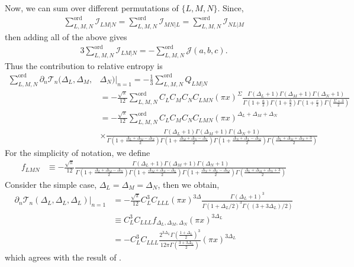 \documentclass[11pt]{article}
\newcommand{\p}{\partial}
\newcommand{\nn}{\nonumber}
\newcommand{\lb}{\left(}
\newcommand{\rb}{\right)}
\begin{document}
Now, we can sum over different permutations of $\{L,M,N\}$. Since,
\begin{align}
    \sum_{L,M,N}^{\text{ord}}\mathcal{I}_{LM|N} =\sum_{L,M,N}^{\text{ord}}\mathcal{I}_{MN|L} =\sum_{L,M,N}^{\text{ord}}\mathcal{I}_{NL|M}  
\end{align}
then adding all of the above gives
\begin{align}
    3\sum_{L,M,N}^{\text{ord}}\mathcal{I}_{LM|N} = - \sum_{L,M,N}^{\text{ord}}\mathcal{J}(a,b,c).
\end{align}
Thus the contribution to relative entropy is 
\begin{align}
    \sum_{L,M,N}^{\text{ord}}\p_n\mathcal{T}_n(\Delta_L,\Delta_M,&\Delta_N)|_{n=1} = -\frac{1}{3}\sum_{L,M,N}^{\text{ord}}Q_{LM|N} \\
    &= -\frac{\sqrt \pi}{12}\sum_{L,M,N}^{\text{ord}} C_LC_MC_NC_{LMN}(\pi x)^\Sigma \frac{\Gamma(\Delta_L + 1)\Gamma(\Delta_M + 1)\Gamma(\Delta_N + 1)}{\Gamma\lb 1+ \frac{a}{2}\rb\Gamma\lb 1+ \frac{b}{2}\rb\Gamma\lb 1+ \frac{c}{2}\rb\Gamma\lb  \frac{\Sigma + 3}{2}\rb} \\
    &= -\frac{\sqrt \pi}{12}\sum_{L,M,N}^{\text{ord}} C_LC_MC_NC_{LMN}(\pi x)^{\Delta_L + \Delta_M+\Delta_N} \nn\\& 
    \times\frac{\Gamma(\Delta_L + 1)\Gamma(\Delta_M + 1)\Gamma(\Delta_N + 1)}{\Gamma\lb 1+ \frac{\Delta_L + \Delta_M-\Delta_N}{2}\rb\Gamma\lb 1+ \frac{\Delta_M + \Delta_N-\Delta_L}{2}\rb\Gamma\lb 1+ \frac{\Delta_N + \Delta_L-\Delta_M}{2}\rb\Gamma\lb  \frac{\Delta_L + \Delta_M+\Delta_N + 3}{2}\rb}
\end{align}
For the simplicity of notation, we define 
\begin{align}
    f_{LMN} &\equiv -\frac{\sqrt \pi}{12}
    \frac{\Gamma(\Delta_L + 1)\Gamma(\Delta_M + 1)\Gamma(\Delta_N + 1)}{\Gamma\lb 1+ \frac{\Delta_L + \Delta_M-\Delta_N}{2}\rb\Gamma\lb 1+ \frac{\Delta_M + \Delta_N-\Delta_L}{2}\rb\Gamma\lb 1+ \frac{\Delta_N + \Delta_L-\Delta_M}{2}\rb\Gamma\lb  \frac{\Delta_L + \Delta_M+\Delta_N + 3}{2}\rb}
\end{align}
Consider the simple case, $\Delta_L = \Delta_M = \Delta_N $, then we obtain, 
\begin{align}
    \p_n\mathcal{T}_n(\Delta_L,\Delta_L,\Delta_L)|_{n=1} &= -\frac{\sqrt{\pi}}{12}C_L^3C_{LLL}(\pi x)^{3\Delta} \frac{\Gamma(\Delta_L+1)^3}{\Gamma(1+\Delta_L/2)^3\Gamma((3+3\Delta_L)/2)} \\
    &\equiv C_L^3 C_{LLL} f_{\Delta_L,\Delta_M,\Delta_N} (\pi x)^{3\Delta_L}\\
    &= -C_L^3 C_{LLL}\frac{2^{3\Delta_L}\Gamma \lb\frac{1+\Delta_L}{2}\rb^3}{12\pi \Gamma\lb\frac{3+3\Delta_L}{2}\rb}(\pi x)^{3\Delta_L} 
\end{align}
which agrees with the result of \cite{S_rosi_2018}.
\end{document}
